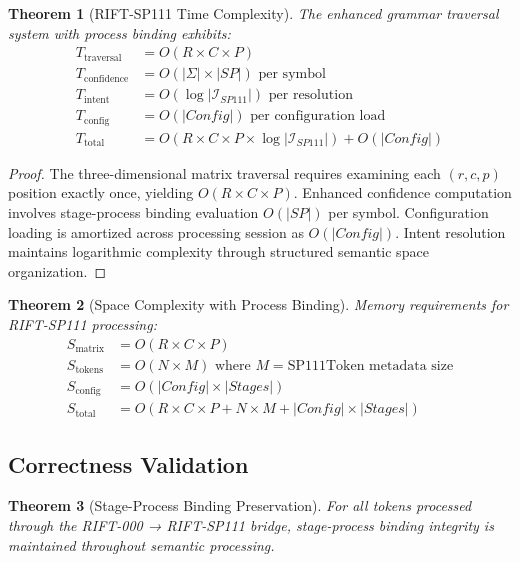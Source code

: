 \documentclass[11pt,a4paper]{article}
\newtheorem{theorem}{Theorem}[section]
\theoremstyle{definition}
\theoremstyle{remark}
\begin{document}
\begin{theorem}[RIFT-SP111 Time Complexity]
\label{thm:sp111-complexity}
The enhanced grammar traversal system with process binding exhibits:
\begin{align}
T_{\text{traversal}} &= O(R \times C \times P) \\
T_{\text{confidence}} &= O(|\Sigma| \times |SP|) \text{ per symbol} \\
T_{\text{intent}} &= O(\log |\mathcal{I}_{SP111}|) \text{ per resolution} \\
T_{\text{config}} &= O(|Config|) \text{ per configuration load} \\
T_{\text{total}} &= O(R \times C \times P \times \log |\mathcal{I}_{SP111}|) + O(|Config|)
\end{align}
\end{theorem}

\begin{proof}
The three-dimensional matrix traversal requires examining each $(r,c,p)$ position exactly once, yielding $O(R \times C \times P)$. Enhanced confidence computation involves stage-process binding evaluation $O(|SP|)$ per symbol. Configuration loading is amortized across processing session as $O(|Config|)$. Intent resolution maintains logarithmic complexity through structured semantic space organization.
\end{proof}

\begin{theorem}[Space Complexity with Process Binding]
\label{thm:space-complexity}
Memory requirements for RIFT-SP111 processing:
\begin{align}
S_{\text{matrix}} &= O(R \times C \times P) \\
S_{\text{tokens}} &= O(N \times M) \text{ where } M = \text{SP111Token metadata size} \\
S_{\text{config}} &= O(|Config| \times |Stages|) \\
S_{\text{total}} &= O(R \times C \times P + N \times M + |Config| \times |Stages|)
\end{align}
\end{theorem}

\subsection{Correctness Validation}
\label{subsec:correctness}

\begin{theorem}[Stage-Process Binding Preservation]
\label{thm:binding-preservation}
For all tokens processed through the RIFT-000 → RIFT-SP111 bridge, stage-process binding integrity is maintained throughout semantic processing.
\end{theorem}
\end{document}
